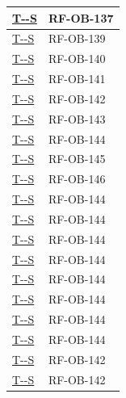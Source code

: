 \documentclass[a4paper,12pt]{article}
\newcounter{testsys}
\newcommand{\systestref}{%
  \hyperlink{T-\arabic{testsys}-S}{T-\arabic{testsys}-S}%
}
\begin{document}
\begin{center}
\begin{longtable}{|>{\centering\arraybackslash}p{5cm}|>{\centering\arraybackslash}p{9cm}|}
\stepcounter{testsys}
\systestref & RF-OB-137 \\
\hline

\stepcounter{testsys}
\systestref & RF-OB-139 \\
\hline

\stepcounter{testsys}
\systestref & RF-OB-140 \\
\hline

\stepcounter{testsys}
\systestref & RF-OB-141 \\
\hline

\stepcounter{testsys}
\systestref & RF-OB-142 \\
\hline

\stepcounter{testsys}
\systestref & RF-OB-143 \\
\hline

\stepcounter{testsys}
\systestref & RF-OB-144 \\
\hline

\stepcounter{testsys}
\systestref & RF-OB-145 \\
\hline

\stepcounter{testsys}
\systestref & RF-OB-146 \\
\hline

\stepcounter{testsys}
\systestref & RF-OB-144 \\
\hline

\stepcounter{testsys}
\systestref & RF-OB-144 \\
\hline

\stepcounter{testsys}
\systestref & RF-OB-144 \\
\hline

\stepcounter{testsys}
\systestref & RF-OB-144 \\
\hline

\stepcounter{testsys}
\systestref & RF-OB-144 \\
\hline

\stepcounter{testsys}
\systestref & RF-OB-144 \\
\hline

\stepcounter{testsys}
\systestref & RF-OB-144 \\
\hline

\stepcounter{testsys}
\systestref & RF-OB-144 \\
\hline

\stepcounter{testsys}
\systestref & RF-OB-142 \\
\hline

\stepcounter{testsys}
\systestref & RF-OB-142 \\
\hline


\end{longtable}
\end{center}
\end{document}
